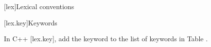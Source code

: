 
[lex]{Lexical conventions}

\setcounter{section}{10}
[lex.key]{Keywords}

\pnum
In C++ [lex.key], add the keyword  to the list of
keywords in Table .

